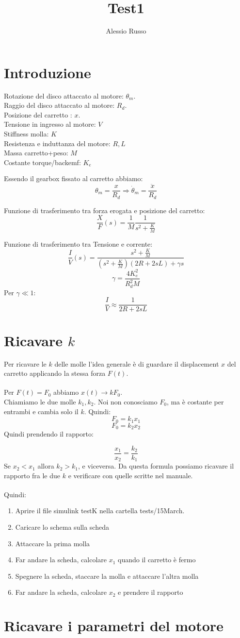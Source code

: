 \documentclass[10pt,a4paper]{article}
\author{Alessio Russo}
\title{Test1}
\begin{document}
\tableofcontents

\section{Introduzione}
Rotazione del disco attaccato al motore: $\theta_m$. \\
Raggio del disco attaccato al motore: $R_d$. \\
Posizione del carretto : $x$. \\
Tensione in ingresso al motore: $V$ \\
Stiffness molla: $K$ \\
Resistenza e induttanza del motore: $R,L$ \\
Massa carretto+peso: $M$ \\
Costante torque/backemf: $K_e$

Essendo il gearbox fissato al carretto abbiamo:
$$\theta_m = \frac{x}{R_d} \Rightarrow \dot{\theta}_m = \frac{\ddot{x}}{R_d}$$

Funzione di trasferimento tra forza erogata e posizione del carretto:
$$\frac{X}{F}(s) = \frac{1}{M} \frac{1}{s^2+\frac{K}{M}}$$

Funzione di trasferimento tra Tensione e corrente:
$$\frac{I}{V}(s) = \frac{s^2+\frac{K}{M}}{(s^2+\frac{K}{M})(2R+2sL)+\gamma s}$$
$$\gamma = \frac{4K_e^2}{R_d^2M}$$
Per $\gamma \ll 1$:
$$\frac{I}{V} \approx \frac{1}{2R+2sL}$$
\newpage
\section{Ricavare $k$}
Per ricavare le $k$ delle molle l'idea generale è di guardare il displacement $x$ del carretto applicando la stessa forza $F(t)$. \\ \\
Per $F(t)=F_0$ abbiamo $x(t) \to kF_0$. \\
Chiamiamo le due molle $k_1,k_2$. Noi non conosciamo $F_0$, ma è costante per entrambi e cambia solo il $k$. Quindi:
$$F_0 = k_1 x_1$$
$$F_0 = k_2 x_2$$
Quindi prendendo il rapporto:

$$\frac{x_1}{x_2} = \frac{k_2}{k_1}$$
Se $x_2 < x_1$ allora $k_2 > k_1$, e viceversa.  Da questa formula possiamo ricavare il rapporto fra le due $k$ e verificare con quelle scritte nel manuale. \\ \\
Quindi:
\begin{enumerate}
\item Aprire il file simulink testK nella cartella tests/15March.
\item Caricare lo schema sulla scheda
\item Attaccare la prima molla
\item Far andare la scheda, calcolare $x_1$ quando il carretto è fermo
\item Spegnere la scheda, staccare la molla e attaccare l'altra molla
\item Far andare la scheda, calcolare $x_2$ e prendere il rapporto
\end{enumerate}
\newpage
\section{Ricavare i parametri del motore}
\end{document}
